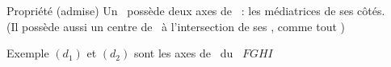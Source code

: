 \documentclass{beamer}
\begin{document}
\begin{frame}
	\frametitle{}  
	\framesubtitle{}
	
	\begin{columns}[onlytextwidth]	
		\begin{column}{0.7\textwidth}

		\begin{alertblock}{Propriété (admise)}
			Un \rect\ possède deux axes de \sym\ : les médiatrices de ses côtés. (Il possède aussi un centre de \sym\ à l'intersection de ses \diags , comme tout \para)
		\end{alertblock}
		
		\begin{block}{Exemple}
			$(d_1)$ et $(d_2)$ sont les axes de \sym\ du \rect\ $FGHI$
		\end{block}
	\end{column}
	\begin{column}{0.3\textwidth}
	\end{column}	
\end{columns}
	
\end{frame}
\end{document}
